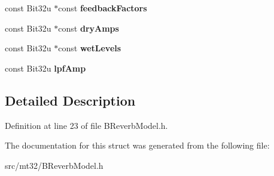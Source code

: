 \begin{DoxyCompactItemize}
\item 
\hypertarget{structMT32Emu_1_1BReverbSettings_a9dcdc476774c91347d8ca421f50aac11}{const Bit32u $\ast$const {\bfseries feedback\-Factors}}\label{structMT32Emu_1_1BReverbSettings_a9dcdc476774c91347d8ca421f50aac11}

\item 
\hypertarget{structMT32Emu_1_1BReverbSettings_ad939fe9174e4076790327c769abcfbfc}{const Bit32u $\ast$const {\bfseries dry\-Amps}}\label{structMT32Emu_1_1BReverbSettings_ad939fe9174e4076790327c769abcfbfc}

\item 
\hypertarget{structMT32Emu_1_1BReverbSettings_abbbcdfb7ec16be3091379fe4c2b2863d}{const Bit32u $\ast$const {\bfseries wet\-Levels}}\label{structMT32Emu_1_1BReverbSettings_abbbcdfb7ec16be3091379fe4c2b2863d}

\item 
\hypertarget{structMT32Emu_1_1BReverbSettings_a3a6033b17c239c17a689acd9130a82a6}{const Bit32u {\bfseries lpf\-Amp}}\label{structMT32Emu_1_1BReverbSettings_a3a6033b17c239c17a689acd9130a82a6}

\end{DoxyCompactItemize}


\subsection{Detailed Description}


Definition at line 23 of file B\-Reverb\-Model.\-h.



The documentation for this struct was generated from the following file\-:\begin{DoxyCompactItemize}
\item 
src/mt32/B\-Reverb\-Model.\-h\end{DoxyCompactItemize}
